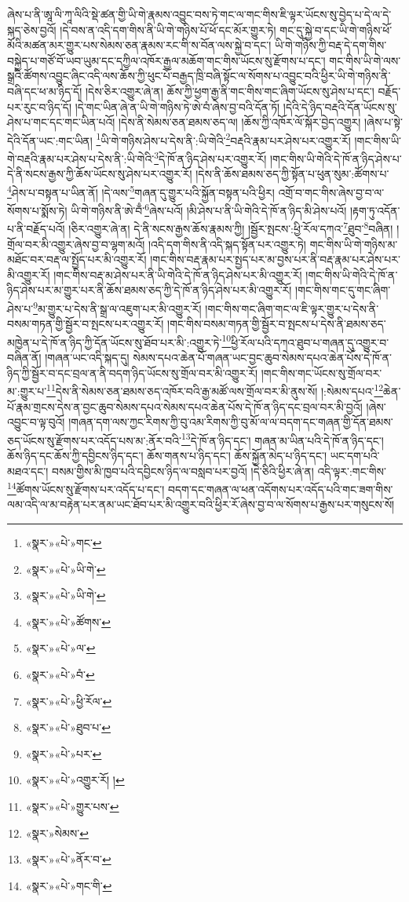 ཞེས་པ་ནི་ཨཱ་ལི་ཀཱ་ལིའི་སྡེ་ཚན་གྱི་ཡི་གེ་རྣམས་འབྱུང་བས་ཏེ་གང་ལ་གང་གིས་ཇི་ལྟར་ཡོངས་སུ་བྱེད་པ་དེ་ལ་དེ་སྐད་ཅེས་བྱའོ། །དེ་བས་ན་འདི་དག་གིས་ནི་ཡི་གེ་གཉིས་པོ་ཕོ་དང་མོར་གྱུར་ཏེ། གང་དུ་སྐྱེ་བ་དང་ཡི་གེ་གཉིས་ཕོ་མོའི་མཚན་མར་གྱུར་པས་སེམས་ཅན་རྣམས་རང་གི་ས་བོན་ལས་སྐྱེ་བ་དང་། ཡི་གེ་གཉིས་ཀྱི་བརྡ་དེ་དག་གིས་བསྐྱེད་པ་གཙོ་བོ་ཡབ་ཡུམ་དང་དཀྱིལ་འཁོར་རྒྱལ་མཆོག་གང་གིས་ཡོངས་སུ་རྫོགས་པ་དང་། གང་གིས་ཡི་གེ་ལས་སྒྲའི་ཚོགས་འབྱུང་ཞིང་འདི་ལས་ཆོས་ཀྱི་ཕུང་པོ་བརྒྱད་ཁྲི་བཞི་སྟོང་ལ་སོགས་པ་འབྱུང་བའི་ཕྱིར་ཡི་གེ་གཉིས་ནི་བཞི་དང་ཕ་མ་ཉིད་དོ། །དེས་ཅིར་འགྱུར་ཞེ་ན། ཆོས་ཀྱི་ཕྱག་རྒྱ་ནི་གང་གིས་གང་ཞིག་ཡོངས་སུ་ཤེས་པ་དང་། བརྗོད་པར་རུང་བ་ཉིད་དོ། །དེ་གང་ཡིན་ཞེ་ན་ཡི་གེ་གཉིས་ཏེ་ཨེ་བཾ་ཞེས་བྱ་བའི་དོན་ཏོ། །དེའི་དེ་ཉིད་བརྡའི་དོན་ཡོངས་སུ་ཤེས་པ་གང་དང་གང་ཡིན་པའོ། །དེས་ནི་སེམས་ཅན་ཐམས་ཅད་ལ། །ཆོས་ཀྱི་འཁོར་ལོ་སྐོར་བྱེད་འགྱུར། །ཞེས་པ་སྟེ་དེའི་དོན་ཡང་:གང་ཡིན། \footnote{«སྣར་»«པེ་»གང་}ཡི་གེ་གཉིས་ཤེས་པ་དེས་ནི་:ཡི་གེའི་\footnote{«སྣར་»«པེ་»ཡི་གེ་}བརྡའི་རྣམ་པར་ཤེས་པར་འགྱུར་རོ། །གང་གིས་ཡི་གེ་བརྡའི་རྣམ་པར་ཤེས་པ་དེས་ནི་:ཡི་གེའི་\footnote{«སྣར་»«པེ་»ཡི་གེ་}དེ་ཁོ་ན་ཉིད་ཤེས་པར་འགྱུར་རོ། །གང་གིས་ཡི་གེའི་དེ་ཁོ་ན་ཉིད་ཤེས་པ་དེ་ནི་སངས་རྒྱས་ཀྱི་ཆོས་ཡོངས་སུ་ཤེས་པར་འགྱུར་རོ། །དེས་ནི་ཆོས་ཐམས་ཅད་ཀྱི་སྟོན་པ་ཕུན་སུམ་:ཚོགས་པ་\footnote{«སྣར་»«པེ་»ཚོགས་}ཤེས་པ་བསྟན་པ་ཡིན་ནོ། །དེ་ལས་\footnote{«སྣར་»«པེ་»ལ་}གཞན་དུ་གྱུར་པའི་སྐྱོན་བསྟན་པའི་ཕྱིར། འགྲོ་བ་གང་གིས་ཞེས་བྱ་བ་ལ་སོགས་པ་སྨོས་ཏེ། ཡི་གེ་གཉིས་ནི་ཨེ་བྃ་\footnote{«སྣར་»«པེ་»བཾ་}ཞེས་པའོ། །མི་ཤེས་པ་ནི་ཡི་གེའི་དེ་ཁོ་ན་ཉིད་མི་ཤེས་པའོ། །རྟག་ཏུ་འདོན་པ་ནི་བརྗོད་པའོ། །ཅིར་འགྱུར་ཞེ་ན། དེ་ནི་སངས་རྒྱས་ཆོས་རྣམས་ཀྱི། །སྦྱོར་སྤངས་:ཕྱི་རོལ་དཀའ་\footnote{«སྣར་»«པེ་»ཕྱི་རོལ་}ཐུབ་\footnote{«སྣར་»«པེ་»ཐུབ་པ་}བཞིན། །གྲོལ་བར་མི་འགྱུར་ཞེས་བྱ་བ་ལྷག་མའོ། །འདི་དག་གིས་ནི་འདི་སྐད་སྟོན་པར་འགྱུར་ཏེ། གང་གིས་ཡི་གེ་གཉིས་མ་མཐོང་བར་བརྡ་ལ་སྤྱོད་པར་མི་འགྱུར་རོ། །གང་གིས་བརྡ་རྣམ་པར་སྤྱད་པར་མ་བྱས་པར་ནི་བརྡ་རྣམ་པར་ཤེས་པར་མི་འགྱུར་རོ། །གང་གིས་བརྡ་མ་ཤེས་པར་ནི་ཡི་གེའི་དེ་ཁོ་ན་ཉིད་ཤེས་པར་མི་འགྱུར་རོ། །གང་གིས་ཡི་གེའི་དེ་ཁོ་ན་ཉིད་ཤེས་པར་མ་གྱུར་པར་ནི་ཆོས་ཐམས་ཅད་ཀྱི་དེ་ཁོ་ན་ཉིད་ཤེས་པར་མི་འགྱུར་རོ། །གང་གིས་གང་དུ་གང་ཞིག་ཤེས་པ་\footnote{«སྣར་»«པེ་»པར་}མ་གྱུར་པ་དེས་ནི་སྒྲ་ལ་འཇུག་པར་མི་འགྱུར་རོ། །གང་གིས་གང་ཞིག་གང་ལ་ཇི་ལྟར་གྱུར་པ་དེས་ནི་བསམ་གཏན་གྱི་སྦྱོར་བ་སྤངས་པར་འགྱུར་རོ། །གང་གིས་བསམ་གཏན་གྱི་སྦྱོར་བ་སྤངས་པ་དེས་ནི་ཐམས་ཅད་མཁྱེན་པ་དེ་ཁོ་ན་ཉིད་ཀྱི་དོན་ཡོངས་སུ་ཐོབ་པར་མི་:འགྱུར་ཏེ་\footnote{«སྣར་»«པེ་»འགྱུར་རོ། །}ཕྱི་རོལ་པའི་དཀའ་ཐུབ་པ་གཞན་དུ་འགྱུར་བ་བཞིན་ནོ། །གཞན་ཡང་འདི་སྐད་དུ། སེམས་དཔའ་ཆེན་པོ་གཞན་ཡང་བྱང་ཆུབ་སེམས་དཔའ་ཆེན་པོས་དེ་ཁོ་ན་ཉིད་ཀྱི་སྦྱོར་བ་དང་བྲལ་ན་ནི་བདག་ཉིད་ཡོངས་སུ་གྲོལ་བར་མི་འགྱུར་རོ། །གང་གིས་གང་ཡོངས་སུ་གྲོལ་བར་མ་:གྱུར་པ་\footnote{«སྣར་»«པེ་»གྱུར་པས་}དེས་ནི་སེམས་ཅན་ཐམས་ཅད་འཁོར་བའི་རྒྱ་མཚོ་ལས་གྲོལ་བར་མི་ནུས་སོ། །:སེམས་དཔའ་\footnote{«སྣར་»སེམས་}ཆེན་པོ་རྣམ་གྲངས་དེས་ན་བྱང་ཆུབ་སེམས་དཔའ་སེམས་དཔའ་ཆེན་པོས་དེ་ཁོ་ན་ཉིད་དང་བྲལ་བར་མི་བྱའོ། །ཞེས་འབྱུང་བ་ལྟ་བུའོ། །གཞན་དག་ལས་ཀྱང་རིགས་ཀྱི་བུ་འམ་རིགས་ཀྱི་བུ་མོ་ལ་ལ་བདག་དང་གཞན་གྱི་དོན་ཐམས་ཅད་ཡོངས་སུ་རྫོགས་པར་འདོད་པས་མ་:ནོར་བའི་\footnote{«སྣར་»«པེ་»ནོར་བ་}དེ་ཁོ་ན་ཉིད་དང་། གཞན་མ་ཡིན་པའི་དེ་ཁོ་ན་ཉིད་དང་། ཆོས་ཉིད་དང་ཆོས་ཀྱི་དབྱིངས་ཉིད་དང་། ཆོས་གནས་པ་ཉིད་དང་། ཆོས་སྐྱོན་མེད་པ་ཉིད་དང་། ཡང་དག་པའི་མཐའ་དང་། བསམ་གྱིས་མི་ཁྱབ་པའི་དབྱིངས་ཉིད་ལ་བསླབ་པར་བྱའོ། །དེ་ཅིའི་ཕྱིར་ཞེ་ན། འདི་ལྟར་:གང་གིས་\footnote{«སྣར་»«པེ་»གང་གི་}ཚོགས་ཡོངས་སུ་རྫོགས་པར་འདོད་པ་དང་། བདག་དང་གཞན་ལ་ཕན་འདོགས་པར་འདོད་པའི་གང་ཟག་གིས་ལམ་འདི་ལ་མ་བརྟེན་པར་ནམ་ཡང་ཐོབ་པར་མི་འགྱུར་བའི་ཕྱིར་རོ་ཞེས་བྱ་བ་ལ་སོགས་པ་རྒྱས་པར་གསུངས་སོ། 